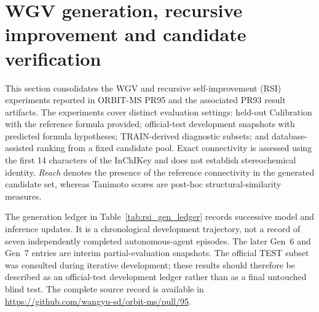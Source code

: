 
\clearpage
\section{WGV generation, recursive improvement and candidate verification}
\label{sec:wgv_rsi_results}

This section consolidates the WGV and recursive self-improvement (RSI) experiments
reported in ORBIT-MS PR95 and the associated PR93 result artifacts. The experiments
cover distinct evaluation settings: held-out Calibration with the reference formula
provided; official-test development snapshots with predicted formula hypotheses;
TRAIN-derived diagnostic subsets; and database-assisted ranking from a fixed
candidate pool. Exact connectivity is assessed using the first 14 characters of the
InChIKey and does not establish stereochemical identity. \emph{Reach} denotes the
presence of the reference connectivity in the generated candidate set, whereas
Tanimoto scores are post-hoc structural-similarity measures.

The generation ledger in Table~\ref{tab:rsi_gen_ledger} records successive model and
inference updates. It is a chronological development trajectory, not a record of
seven independently completed autonomous-agent episodes. The later Gen~6 and Gen~7
entries are interim partial-evaluation snapshots. The official TEST subset was
consulted during iterative development; these results should therefore be described
as an official-test development ledger rather than as a final untouched blind test.
The complete source record is available in
\url{https://github.com/wangyu-sd/orbit-ms/pull/95}.

